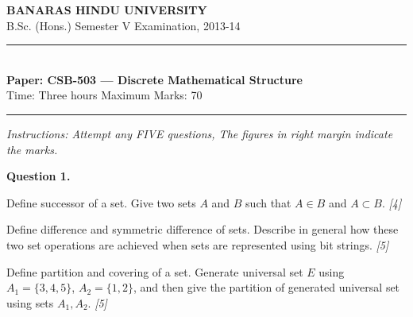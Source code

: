 \documentclass[11pt,a4paper]{article}
\newcommand{\pts}[1]{\hfill\textit{[#1]}}
\begin{document}
\begin{center}
  {\large\bfseries BANARAS HINDU UNIVERSITY}\\[2pt]
  {\normalsize B.Sc. (Hons.) Semester V Examination, 2013-14}\\[6pt]
  \rule{0.8\linewidth}{0.5pt}\\[6pt]
  {\large\bfseries Paper: CSB-503 --- Discrete Mathematical Structure}\\[4pt]
  {\normalsize Time: Three hours \hfill Maximum Marks: 70}
\end{center}

\rule{\linewidth}{0.4pt}

\smallskip
\noindent\textit{Instructions: Attempt any FIVE questions, The figures in right margin indicate the marks.}

\bigskip

\medskip\noindent\textbf{Question 1.}
\begin{parts}
  \item Define successor of a set. Give two sets $A$ and $B$ such that $A \in B$ and $A \subset B$. \pts{4}
  \item Define difference and symmetric difference of sets. Describe in general how these two set operations are achieved when sets are represented using bit strings. \pts{5}
  \item Define partition and covering of a set. Generate universal set $E$ using $A_1 = \{3, 4, 5\}$, $A_2 = \{1, 2\}$, and then give the partition of generated universal set using sets $A_1, A_2$. \pts{5}
\end{parts}
\end{document}
